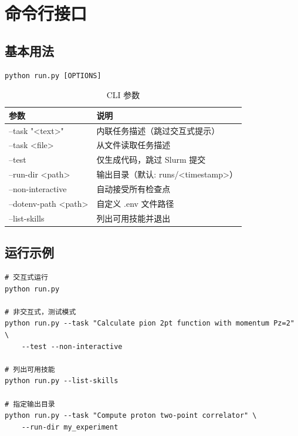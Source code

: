 \documentclass[12pt,a4paper]{ctexart}
\begin{document}
\section{命令行接口}

\subsection{基本用法}

\begin{lstlisting}[style=bashcode]
python run.py [OPTIONS]
\end{lstlisting}

\begin{table}[h]
\centering
\begin{tabular}{@{}>{\ttfamily}ll@{}}
\toprule
\textbf{参数}                    & \textbf{说明} \\
\midrule
--task "<text>"                  & 内联任务描述（跳过交互式提示）\\
--task <file>                    & 从文件读取任务描述 \\
--test                           & 仅生成代码，跳过 Slurm 提交 \\
--run-dir <path>                 & 输出目录（默认: runs/<timestamp>）\\
--non-interactive                & 自动接受所有检查点 \\
--dotenv-path <path>             & 自定义 .env 文件路径 \\
--list-skills                    & 列出可用技能并退出 \\
\bottomrule
\end{tabular}
\caption{CLI 参数}
\end{table}

\subsection{运行示例}

\begin{lstlisting}[style=bashcode]
# 交互式运行
python run.py

# 非交互式，测试模式
python run.py --task "Calculate pion 2pt function with momentum Pz=2" \
    --test --non-interactive

# 列出可用技能
python run.py --list-skills

# 指定输出目录
python run.py --task "Compute proton two-point correlator" \
    --run-dir my_experiment
\end{lstlisting}
\end{document}
